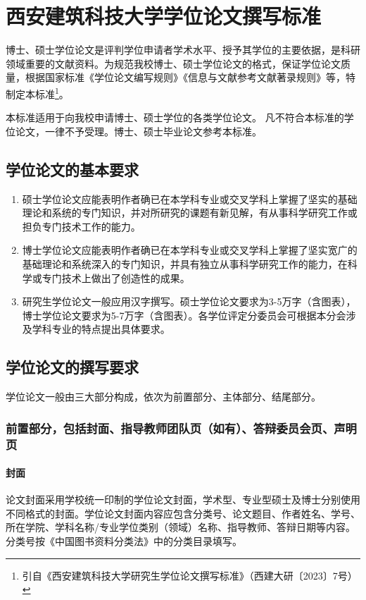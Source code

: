 \chapter{西安建筑科技大学学位论文撰写标准}
博士、硕士学位论文是评判学位申请者学术水平、授予其学位的主要依据，是科研领域重要的文献资料。为规范我校博士、硕士学位论文的格式，保证学位论文质量，根据国家标准《学位论文编写规则》《信息与文献参考文献著录规则》等，特制定本标准\footnote{引自《西安建筑科技大学研究生学位论文撰写标准》（西建大研〔2023〕7号）}。

本标准适用于向我校申请博士、硕士学位的各类学位论文。 凡不符合本标准的学位论文，一律不予受理。博士、硕士毕业论文参考本标准。
\section{学位论文的基本要求}
\begin{enumerate}
    \item 硕士学位论文应能表明作者确已在本学科专业或交叉学科上掌握了坚实的基础理论和系统的专门知识，并对所研究的课题有新见解，有从事科学研究工作或担负专门技术工作的能力。
    \item 博士学位论文应能表明作者确已在本学科专业或交叉学科上掌握了坚实宽广的基础理论和系统深入的专门知识，并具有独立从事科学研究工作的能力，在科学或专门技术上做出了创造性的成果。
    \item 研究生学位论文一般应用汉字撰写。硕士学位论文要求为3-5万字（含图表），博士学位论文要求为5-7万字（含图表）。各学位评定分委员会可根据本分会涉及学科专业的特点提出具体要求。
\end{enumerate}

\section{学位论文的撰写要求}
学位论文一般由三大部分构成，依次为前置部分、主体部分、结尾部分。

\subsection{前置部分，包括封面、指导教师团队页（如有）、答辩委员会页、声明页}
\subsubsection{封面}
论文封面采用学校统一印制的学位论文封面，学术型、专业型硕士及博士分别使用不同格式的封面。学位论文封面内容应包含分类号、论文题目、作者姓名、学号、所在学院、学科名称/专业学位类别（领域）名称、指导教师、答辩日期等内容。分类号按《中国图书资料分类法》中的分类目录填写。


